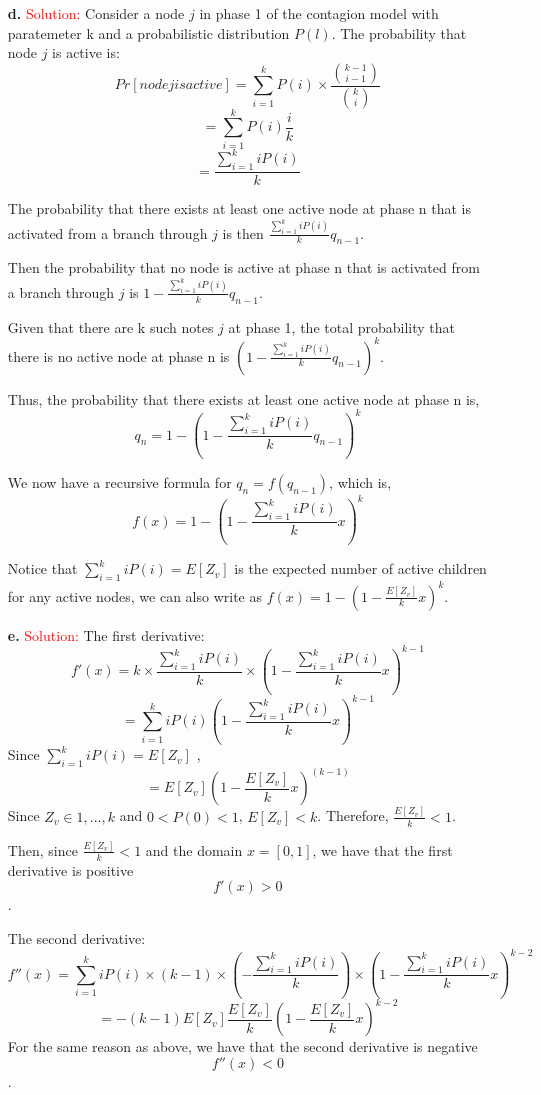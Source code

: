 \documentclass[11pt]{article} %
\begin{document}
\begin{itemize}
        \item[\textbf{d.}]  
\textcolor{red}{Solution:}
Consider a node $j$ in phase 1 of the contagion model with paratemeter k and a probabilistic distribution $P(l)$. The probability that node $j$ is active is:
$$ Pr[node j is active]=\sum_{i=1}^{k} P(i) \times \frac{{k-1 \choose i-1}}{{k \choose i}}$$
$$ =\sum_{i=1}^{k} P(i) \frac{i}{k}$$
$$ =\frac{\sum_{i=1}^{k} i P(i)}{k}$$

The probability that there exists at least one active node at phase n that is activated from a branch through $j$ is then $\frac{\sum_{i=1}^{k} i P(i)}{k} q_{n-1}$.

Then the probability that no node is active at phase n that is activated from a branch through $j$ is $1-\frac{\sum_{i=1}^{k} i P(i)}{k} q_{n-1}$.

Given that there are k such notes $j$ at phase 1, the total probability that there is no active node at phase n is $(1-\frac{\sum_{i=1}^{k} i P(i)}{k} q_{n-1})^k$.

Thus, the probability that there exists at least one active node at phase n is,
$$ q_n=1-(1-\frac{\sum_{i=1}^{k} i P(i)}{k} q_{n-1})^k$$
 
We now have a recursive formula for $q_n=f(q_{n-1})$, which is,
$$ f(x)=1-(1-\frac{\sum_{i=1}^{k} i P(i)}{k} x)^k $$

Notice that $\sum_{i=1}^{k} i P(i)=E[Z_v]$ is the expected number of active children for any active nodes, we can also write as $f(x)=1-(1-\frac{E[Z_v]}{k} x)^k$.


        \item[\textbf{e.}]  
\textcolor{red}{Solution:}
The first derivative:
$$f'(x)=k \times \frac{\sum_{i=1}^{k} i P(i)}{k} \times (1-\frac{\sum_{i=1}^{k} i P(i)}{k} x)^{k-1}$$
$$=\sum_{i=1}^{k} i P(i) (1-\frac{\sum_{i=1}^{k} i P(i)}{k} x)^{k-1}$$
Since $\sum_{i=1}^{k} i P(i)=E[Z_v]$ ,
$$=E[Z_v] (1-\frac{E[Z_v]}{k} x)^(k-1)$$
Since $Z_v \in {1,...,k}$ and $0<P(0)<1$, $E[Z_v]<k$. Therefore, $\frac{E[Z_v]}{k}<1$.

Then, since $\frac{E[Z_v]}{k}<1$ and the domain $x=[0,1]$, we have that the first derivative is positive $$f'(x)>0$$.

The second derivative:
$$f''(x)=\sum_{i=1}^{k} i P(i) \times (k-1) \times (-\frac{\sum_{i=1}^{k} i P(i)}{k}) \times (1-\frac{\sum_{i=1}^{k} i P(i)}{k} x)^{k-2}$$
$$=-(k-1)E[Z_v] \frac{E[Z_v]}{k} (1-\frac{E[Z_v]}{k} x)^{k-2}$$
For the same reason as above, we have that the second derivative is negative $$f''(x)<0$$.


\end{itemize}
\end{document}
